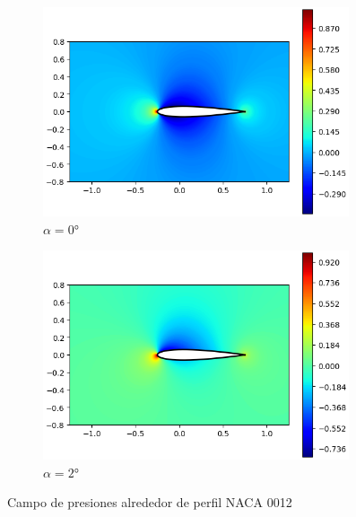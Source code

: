 \documentclass[letterpaper, openright, 12pt]{book}
\begin{document}
\begin{figure}[htbp!]
\begin{subfigure}[c]{0.48\textwidth}
            \includegraphics[keepaspectratio, width=0.99\textwidth]
                {./img/potential_flow_cp_0}
            \caption{$\alpha = 0\si{\degree}$}
            \label{fig:potential_flow_cp_0}
        \end{subfigure}
        \hfill
        \begin{subfigure}[c]{0.48\textwidth}
            \includegraphics[keepaspectratio, width=0.99\textwidth]
                {./img/potential_flow_cp_2}
            \caption{$\alpha = 2\si{\degree}$}
            \label{fig:potential_flow_cp_2}
        \end{subfigure}
        \caption{Campo de presiones alrededor de perfil NACA 0012}
        \label{fig:potential_flow_cp__0}
    \end{figure}
\end{document}
